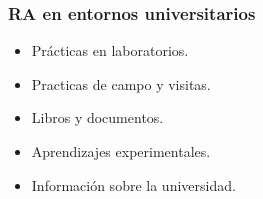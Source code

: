 \begin{frame}
	\frametitle{RA en entornos universitarios}
			\begin{itemize}
				\item Prácticas en laboratorios.
			
				\item Practicas de campo y visitas.
			
				\item Libros y documentos.
				
				\item Aprendizajes experimentales.
			
				\item Información sobre la universidad.
				
			\end{itemize}
		\endblock{}
\end{frame}

